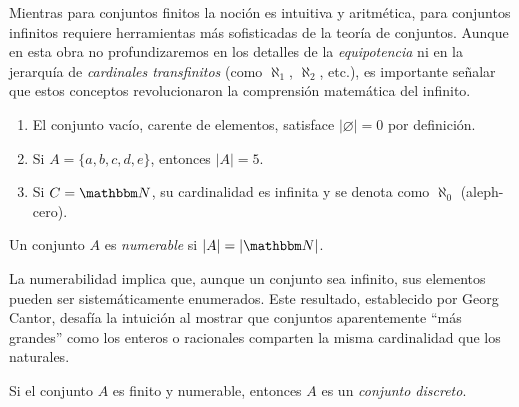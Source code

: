 Mientras para conjuntos finitos la noción es intuitiva y aritmética, para conjuntos infinitos requiere herramientas más sofisticadas de la teoría de conjuntos. Aunque en esta obra no profundizaremos en los detalles de la \emph{equipotencia} ni en la jerarquía de \emph{cardinales transfinitos} (como $\aleph_1$, $\aleph_2$, etc.), es importante señalar que estos conceptos revolucionaron la comprensión matemática del infinito.

\newpage

\begin{examplebox}{}{}
    \begin{enumerate}[topsep=6pt, itemsep=0pt]
        \item El conjunto vacío, carente de elementos, satisface $| \varnothing | = 0$ por definición.
        \item Si $A = \{a, b, c, d, e\}$, entonces $|A| = 5$.
        \item Si $C = \NN$, su cardinalidad es infinita y se denota como $\aleph_0$ (aleph-cero).
    \end{enumerate}
\end{examplebox}

\begin{definicion}{}{}
    Un conjunto $A$ es \emph{numerable} si $|A| = |\NN|$.
\end{definicion}

La numerabilidad implica que, aunque un conjunto sea infinito, sus elementos pueden ser sistemáticamente enumerados. Este resultado, establecido por Georg Cantor, desafía la intuición al mostrar que conjuntos aparentemente “más grandes” como los enteros o racionales comparten la misma cardinalidad que los naturales.

\begin{definicion}{}{}
    Si el conjunto $A$ es finito y numerable, entonces $A$ es un \emph{conjunto discreto}.
\end{definicion}
